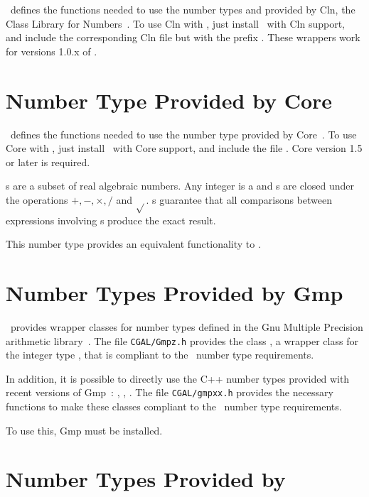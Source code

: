 \cgal\ defines the functions needed to use the number types 
and  provided by {\sc Cln}, the Class Library for
Numbers~\cite{cln}.  To use {\sc Cln} with \cgal, just install \cgal\ with
{\sc Cln} support, and include the corresponding {\sc Cln} file but with the
prefix .  These wrappers work for versions 1.0.x of .


\section{Number Type Provided by {\sc Core}}
\label{CORE}

\cgal\ defines the functions needed to use the number type 
provided by {\sc Core}~\cite{klpy-clp-99}.  To use {\sc Core} with \cgal, just
install \cgal\ with {\sc Core} support, and include the file
.  {\sc Core} version 1.5 or later is required.

s are a subset of real algebraic numbers.  Any integer is a
 and s are closed under the operations
$+,-,\times,/$ and $\sqrt{}$.  s guarantee that all
comparisons between expressions involving s produce the exact
result.

This number type provides an equivalent functionality to .


\section{Number Types Provided by {\sc Gmp}}

\cgal\ provides wrapper classes for number types defined in the
{\sc Gnu} Multiple Precision arithmetic library~\cite{g-ggmpa-}.
The file {\tt  CGAL/Gmpz.h} provides the class ,
a wrapper class for the integer type , that is compliant to the
\cgal\ number type requirements.

In addition, it is possible to directly use the C++ number types provided with
recent versions of {\sc Gmp}~: , ,
.  The file {\tt CGAL/gmpxx.h} provides the necessary functions
to make these classes compliant to the \cgal\ number type requirements.

To use this, {\sc Gmp} must be installed.


\section{Number Types Provided by \leda}
\label{leda-nt}

